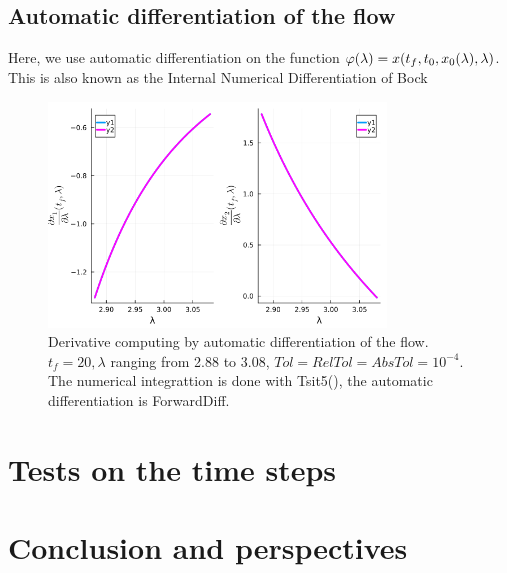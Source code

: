 \documentclass[a4paper,10pt]{article}
\newcommand\sizeFig{0.8}
\begin{document}
\subsection{Automatic differentiation of the flow}

Here, we use automatic differentiation on the function $\varphi(\lambda) = x(t_f,t_0,x_0(\lambda),\lambda)$. This is also known as the Internal Numerical Differentiation of  Bock \cite{Bock81}

\begin{figure}[ht!]
    \includegraphics[width=\sizeFig\textwidth]{./figures/plot_diff_flow1.png}

    \caption{Derivative computing by automatic differentiation of the flow. $t_f=20, \lambda$ ranging from 2.88 to 3.08, $Tol=RelTol=AbsTol=10^{-4}$.  The numerical integrattion is done with Tsit5(), the automatic differentiation is ForwardDiff.}
\end{figure}

\section{Tests on the time steps}











\section{Conclusion and perspectives}



 
\end{document}
